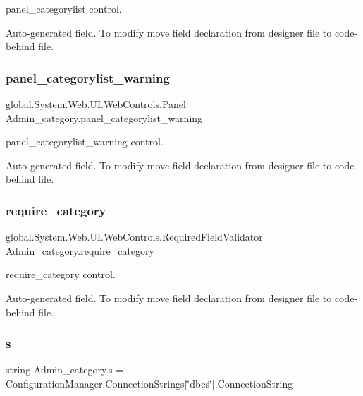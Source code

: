 panel\+\_\+categorylist control. 

Auto-\/generated field. To modify move field declaration from designer file to code-\/behind file. \mbox{\label{class_admin__category_aaa166e50a21b90616ba7d49cca3ab9fc}} 
\subsubsection{\texorpdfstring{panel\_categorylist\_warning}{panel\_categorylist\_warning}}
{\footnotesize\ttfamily global.\+System.\+Web.\+U\+I.\+Web\+Controls.\+Panel Admin\+\_\+category.\+panel\+\_\+categorylist\+\_\+warning\hspace{0.3cm}{\ttfamily [protected]}}



panel\+\_\+categorylist\+\_\+warning control. 

Auto-\/generated field. To modify move field declaration from designer file to code-\/behind file. \mbox{\label{class_admin__category_a85b2bad15e0b0cd92ce61f736e9bffd3}} 
\subsubsection{\texorpdfstring{require\_category}{require\_category}}
{\footnotesize\ttfamily global.\+System.\+Web.\+U\+I.\+Web\+Controls.\+Required\+Field\+Validator Admin\+\_\+category.\+require\+\_\+category\hspace{0.3cm}{\ttfamily [protected]}}



require\+\_\+category control. 

Auto-\/generated field. To modify move field declaration from designer file to code-\/behind file. \mbox{\label{class_admin__category_ad07b55cca37cfcbe3f02139b816d72dd}} 
\subsubsection{\texorpdfstring{s}{s}}
{\footnotesize\ttfamily string Admin\+\_\+category.\+s = Configuration\+Manager.\+Connection\+Strings\mbox{[}\char`\"{}dbcs\char`\"{}\mbox{]}.Connection\+String\hspace{0.3cm}{\ttfamily [private]}}

